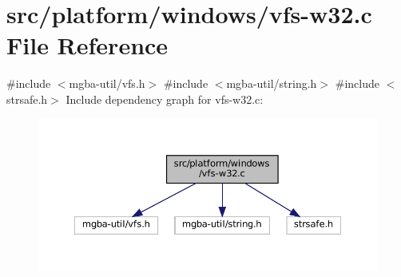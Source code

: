 \hypertarget{vfs-w32_8c}{}\section{src/platform/windows/vfs-\/w32.c File Reference}
\label{vfs-w32_8c}
{\ttfamily \#include $<$mgba-\/util/vfs.\+h$>$}\newline
{\ttfamily \#include $<$mgba-\/util/string.\+h$>$}\newline
{\ttfamily \#include $<$strsafe.\+h$>$}\newline
Include dependency graph for vfs-\/w32.c\+:
\nopagebreak
\begin{figure}[H]
\begin{center}
\leavevmode
\includegraphics[width=350pt]{vfs-w32_8c__incl}
\end{center}
\end{figure}
